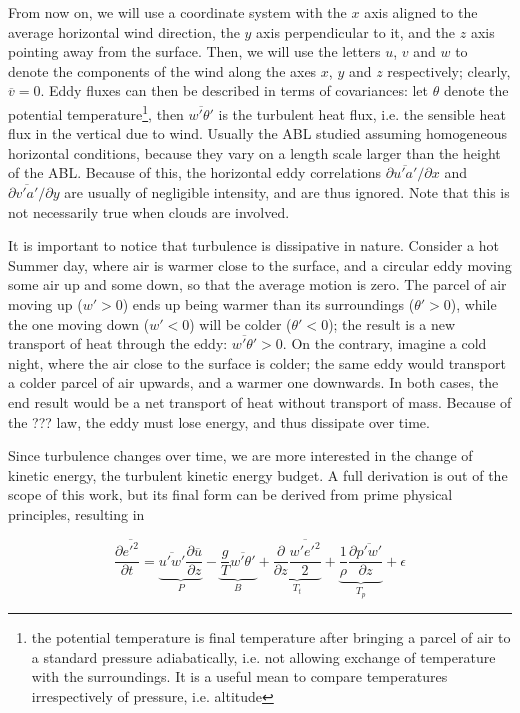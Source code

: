 \documentclass[12pt]{book}
\begin{document}
From now on, we will use a coordinate system with the $x$ axis aligned to the average horizontal wind direction, the $y$ axis perpendicular to it, and the $z$ axis pointing away from the surface. Then, we will use the letters $u$, $v$ and $w$ to denote the components of the wind along the axes $x$, $y$ and $z$ respectively; clearly, $\overline{v}=0$. Eddy fluxes can then be described in terms of covariances: let $\theta$ denote the potential temperature\footnote{the potential temperature is final temperature after bringing a parcel of air to a standard pressure adiabatically, i.e. not allowing exchange of temperature with the surroundings. It is a useful mean to compare temperatures irrespectively of pressure, i.e. altitude}, then $\overline{w'\theta'}$ is the turbulent heat flux, i.e. the sensible heat flux in the vertical due to wind. Usually the ABL  studied assuming homogeneous horizontal conditions, because they vary on a length scale larger than the height of the ABL. Because of this, the horizontal eddy correlations $\partial\overline{u'a'}/\partial x$ and $\partial\overline{v'a'}/\partial y$ are usually of negligible intensity, and are thus ignored. Note that this is not necessarily true when clouds are involved.

It is important to notice that turbulence is dissipative in nature. Consider a hot Summer day, where air is warmer close to the surface, and a circular eddy moving some air up and some down, so that the average motion is zero. The parcel of air moving up ($w'>0$) ends up being warmer than its surroundings ($\theta'>0$), while the one moving down ($w'<0$) will be colder ($\theta'<0$); the result is a new transport of heat through the eddy: $\overline{w'\theta'}>0$. On the contrary, imagine a cold night, where the air close to the surface is colder; the same eddy would transport a colder parcel of air upwards, and a warmer one downwards. In both cases, the end result would be a net transport of heat without transport of mass. Because of the ??? law, the eddy must lose energy, and thus dissipate over time.

Since turbulence changes over time, we are more interested in the change of kinetic energy, the turbulent kinetic energy budget. A full derivation is out of the scope of this work, but its final form \cite{basicatm} can be derived from prime physical principles, resulting in

\begin{equation}
\frac{\partial\overline{{e'}^2}}{\partial t}
=\underbrace{\overline{u'w'}\frac{\partial\overline{u}}{\partial z}}_P
-\underbrace{\frac{g}{T}\overline{w'\theta'}}_B
+\underbrace{\frac{\partial}{\partial z}\frac{\overline{w'{e'}^2}}{2}}_{T_t}
+\underbrace{\frac{1}{\rho}\frac{\partial\overline{p'w'}}{\partial z}}_{T_p}
+\epsilon
\end{equation}
\end{document}
